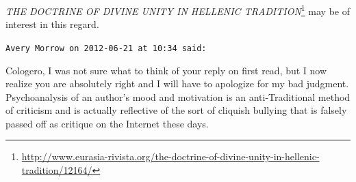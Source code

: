 \begin{footnotesize}
\begin{sffamily}
\textit{THE DOCTRINE OF DIVINE UNITY IN HELLENIC TRADITION}\footnote{\url{http://www.eurasia-rivista.org/the-doctrine-of-divine-unity-in-hellenic-tradition/12164/}} may be of interest in this regard.

\hfill

\texttt{Avery Morrow on 2012-06-21 at 10:34 said:}

Cologero, I was not sure what to think of your reply on first read, but I now realize you are absolutely right and I will have to apologize for my bad judgment. Psychoanalysis of an author's mood and motivation is an anti-Traditional method of criticism and is actually reflective of the sort of cliquish bullying that is falsely passed off as critique on the Internet these days.

\hfill

\end{sffamily}
\end{footnotesize}

